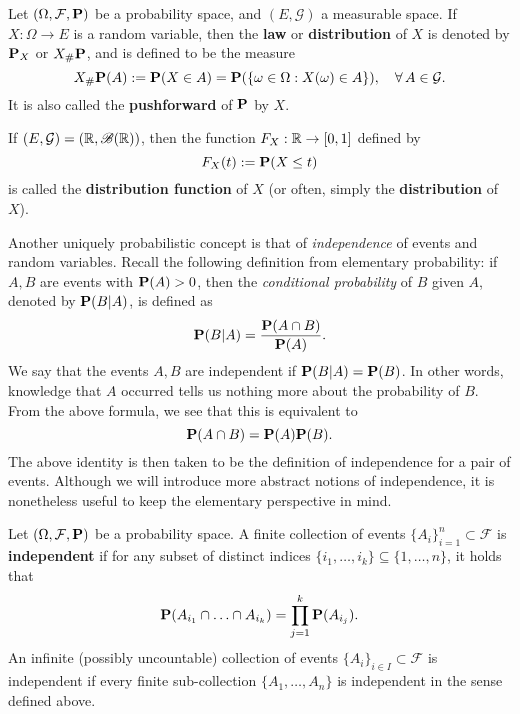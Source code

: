 \begin{definition}
    Let $(\Omega,\mathcal{F},\mathbf{P})$ be a probability space, and $(E,\mathcal{G})$ a measurable space. If $X:\Omega\to E$ is a random variable, then the \textbf{law} or \textbf{distribution} of $X$ is denoted by $\mathbf{P}_X$ or $X_\#\mathbf{P}$, and is defined to be the measure
    \begin{equation*}
        X_\#\mathbf{P}(A) := \mathbf{P}(X\in A) = \mathbf{P}(\{\omega\in\Omega: X(\omega)\in A\}), \quad\forall\, A\in\mathcal{G}.
    \end{equation*}
    It is also called the \textbf{pushforward} of $\mathbf{P}$ by $X$.

    If $(E,\mathcal{G})=(\mathbb{R},\mathscr{B}(\mathbb{R}))$, then the function $F_X:\mathbb{R}\to [0,1]$ defined by
    \begin{equation*}
        F_X(t):= \mathbf{P}(X\le t)
    \end{equation*}
    is called the \textbf{distribution function} of $X$ (or often, simply the \textbf{distribution} of $X$).
\end{definition}

Another uniquely probabilistic concept is that of \emph{independence} of events and random variables. Recall the following definition from elementary probability: if $A, B$ are events with $\mathbf{P}(A)>0$, then the \emph{conditional probability} of $B$ given $A$, denoted by $\mathbf{P}(B|A)$, is defined as
\begin{equation*}
    \mathbf{P}(B|A) = \frac{\mathbf{P}(A\cap B)}{\mathbf{P}(A)}.
\end{equation*}
We say that the events $A, B$ are independent if $\mathbf{P}(B|A) = \mathbf{P}(B)$. In other words, knowledge that $A$ occurred tells us nothing more about the probability of $B$. From the above formula, we see that this is equivalent to
\begin{equation*}
    \mathbf{P}(A\cap B) = \mathbf{P}(A)\mathbf{P}(B).
\end{equation*}
The above identity is then taken to be the definition of independence for a pair of events. Although we will introduce more abstract notions of independence, it is nonetheless useful to keep the elementary perspective in mind.

\begin{definition}
    Let $(\Omega,\mathcal{F},\mathbf{P})$ be a probability space. A finite collection of events $\{A_i\}_{i=1}^n \subset\mathcal{F}$ is \textbf{independent} if for any subset of distinct indices $\{i_1, \ldots, i_k\} \subseteq \{1, \ldots, n\}$, it holds that
\begin{equation*}
    \mathbf{P}(A_{i_1} \cap \ldots \cap A_{i_k}) = \prod_{j=1}^k \mathbf{P}(A_{i_j}).
\end{equation*}
An infinite (possibly uncountable) collection of events $\{A_i\}_{i\in I}\subset\mathcal{F}$ is independent if every finite sub-collection $\{A_1,\ldots,A_n\}$ is independent in the sense defined above.
\end{definition}

